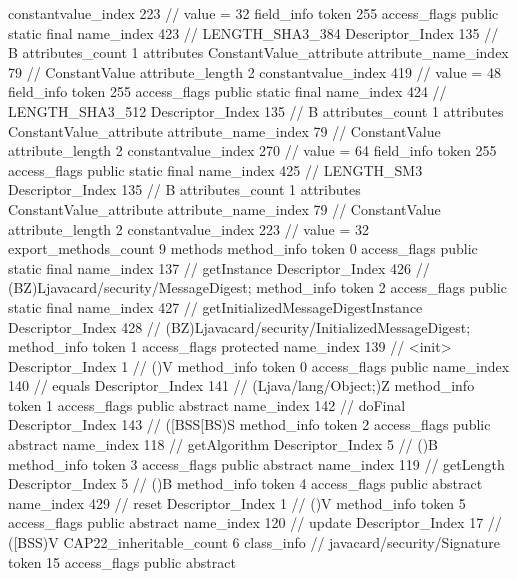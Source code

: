 {{{{{{{					constantvalue_index	223		// value = 32
				}
				}
			}
			field_info {
				token	255
				access_flags	public static final
				name_index	423		// LENGTH_SHA3_384
				Descriptor_Index	135		// B
				attributes_count	1
				attributes {
				ConstantValue_attribute {
					attribute_name_index	79		// ConstantValue
					attribute_length	2
					constantvalue_index	419		// value = 48
				}
				}
			}
			field_info {
				token	255
				access_flags	public static final
				name_index	424		// LENGTH_SHA3_512
				Descriptor_Index	135		// B
				attributes_count	1
				attributes {
				ConstantValue_attribute {
					attribute_name_index	79		// ConstantValue
					attribute_length	2
					constantvalue_index	270		// value = 64
				}
				}
			}
			field_info {
				token	255
				access_flags	public static final
				name_index	425		// LENGTH_SM3
				Descriptor_Index	135		// B
				attributes_count	1
				attributes {
				ConstantValue_attribute {
					attribute_name_index	79		// ConstantValue
					attribute_length	2
					constantvalue_index	223		// value = 32
				}
				}
			}
			}
			export_methods_count	9
			methods {
				method_info {
					token	0
					access_flags	public static final
					name_index	137		// getInstance
					Descriptor_Index	426		// (BZ)Ljavacard/security/MessageDigest;
				}
				method_info {
					token	2
					access_flags	public static final
					name_index	427		// getInitializedMessageDigestInstance
					Descriptor_Index	428		// (BZ)Ljavacard/security/InitializedMessageDigest;
				}
				method_info {
					token	1
					access_flags	protected
					name_index	139		// <init>
					Descriptor_Index	1		// ()V
				}
				method_info {
					token	0
					access_flags	public
					name_index	140		// equals
					Descriptor_Index	141		// (Ljava/lang/Object;)Z
				}
				method_info {
					token	1
					access_flags	public abstract
					name_index	142		// doFinal
					Descriptor_Index	143		// ([BSS[BS)S
				}
				method_info {
					token	2
					access_flags	public abstract
					name_index	118		// getAlgorithm
					Descriptor_Index	5		// ()B
				}
				method_info {
					token	3
					access_flags	public abstract
					name_index	119		// getLength
					Descriptor_Index	5		// ()B
				}
				method_info {
					token	4
					access_flags	public abstract
					name_index	429		// reset
					Descriptor_Index	1		// ()V
				}
				method_info {
					token	5
					access_flags	public abstract
					name_index	120		// update
					Descriptor_Index	17		// ([BSS)V
				}
			}
			CAP22_inheritable_count	6
		}
		class_info {		// javacard/security/Signature
			token	15
			access_flags	public abstract
}}}
